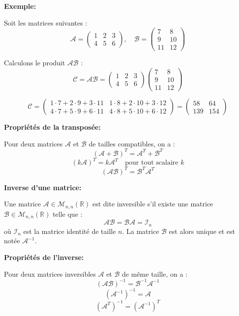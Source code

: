 \textbf{Exemple:}

Soit les matrices suivantes :
\[
\mathcal{A} = \begin{pmatrix}
1 & 2 & 3 \\
4 & 5 & 6
\end{pmatrix}, \quad
\mathcal{B} = \begin{pmatrix}
7 & 8 \\
9 & 10 \\
11 & 12
\end{pmatrix}
\]

Calculons le produit $\mathcal{A} \mathcal{B}$ :
\[
\mathcal{C} = \mathcal{A} \mathcal{B} = \begin{pmatrix}
1 & 2 & 3 \\
4 & 5 & 6
\end{pmatrix}
\begin{pmatrix}
7 & 8 \\
9 & 10 \\
11 & 12
\end{pmatrix}
\]

\[
\mathcal{C} = \begin{pmatrix}
1 \cdot 7 + 2 \cdot 9 + 3 \cdot 11 & 1 \cdot 8 + 2 \cdot 10 + 3 \cdot 12 \\
4 \cdot 7 + 5 \cdot 9 + 6 \cdot 11 & 4 \cdot 8 + 5 \cdot 10 + 6 \cdot 12
\end{pmatrix}
= \begin{pmatrix}
58 & 64 \\
139 & 154
\end{pmatrix}
\]

\textbf{Propriétés de la transposée:}

Pour deux matrices $\mathcal{A}$ et $\mathcal{B}$ de tailles compatibles, on a :
\[
(\mathcal{A} + \mathcal{B})^T = \mathcal{A}^T + \mathcal{B}^T
\]
\[
(k\mathcal{A})^T = k\mathcal{A}^T \quad \text{pour tout scalaire } k
\]
\[
(\mathcal{A} \mathcal{B})^T = \mathcal{B}^T \mathcal{A}^T
\]

\textbf{Inverse d'une matrice:}

Une matrice $\mathcal{A} \in \mathcal{M}_{n,n}(\mathbb{R})$ est dite inversible s'il existe une matrice $\mathcal{B} \in \mathcal{M}_{n,n}(\mathbb{R})$ telle que :
\[
\mathcal{A} \mathcal{B} = \mathcal{B} \mathcal{A} = \mathcal{I}_n
\]
où $\mathcal{I}_n$ est la matrice identité de taille $n$. La matrice $\mathcal{B}$ est alors unique et est notée $\mathcal{A}^{-1}$.

\textbf{Propriétés de l'inverse:}

Pour deux matrices inversibles $\mathcal{A}$ et $\mathcal{B}$ de même taille, on a :
\[
(\mathcal{A} \mathcal{B})^{-1} = \mathcal{B}^{-1} \mathcal{A}^{-1}
\]
\[
(\mathcal{A}^{-1})^{-1} = \mathcal{A}
\]
\[
(\mathcal{A}^T)^{-1} = (\mathcal{A}^{-1})^T
\]

